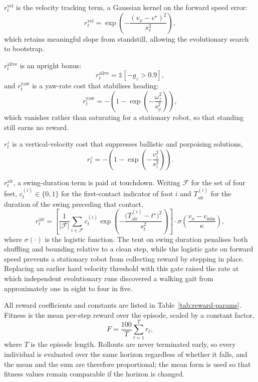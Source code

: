\documentclass{article} %
\begin{document}
$r^{\mathrm{vel}}_t$ is the velocity tracking term, a Gaussian kernel on the forward speed error:
\begin{equation}
r^{\mathrm{vel}}_t = \exp\!\left(
-\frac{\left(v_x - v^\star\right)^2}{s_v^2}\right),
\label{eq:r-vel}
\end{equation}
which retains meaningful slope from standstill, allowing the evolutionary
search to bootstrap.

$r^{\mathrm{alive}}_t$ is an upright bonus:
\begin{equation}
r^{\mathrm{alive}}_t = \mathbb{1}\!\left[-g_z > 0.9\right],
\label{eq:r-alive}
\end{equation}
and $r^{\mathrm{yaw}}_t$ is a yaw-rate cost that stabilises heading:
\begin{equation}
r^{\mathrm{yaw}}_t = -\left(1 - \exp\!\left(
-\frac{\omega_z^2}{s_\psi^2}\right)\right),
\label{eq:r-yaw}
\end{equation}
which vanishes rather than saturating for a stationary robot, so that standing
still earns no reward.

$r^{z}_t$ is a vertical-velocity cost that suppresses ballistic
and porpoising solutions,
\begin{equation}
r^{z}_t = -\left(1 - \exp\!\left(
-\frac{v_z^2}{s_z^2}\right)\right).
\label{eq:r-vz}
\end{equation}

$r^{\mathrm{air}}_t$, a swing-duration term is paid at touchdown. Writing $\mathcal{F}$ for
the set of four feet, $c^{(i)}_t \in \{0, 1\}$ for the first-contact indicator
of foot $i$ and $T^{(i)}_{\mathrm{air}}$ for the duration of the swing
preceding that contact,
\begin{equation}
r^{\mathrm{air}}_t = \left[
\frac{1}{|\mathcal{F}|}\sum_{i \in \mathcal{F}} c^{(i)}_t
\exp\!\left(-\frac{\bigl(T^{(i)}_{\mathrm{air}} - t^\star\bigr)^2}
{s_t^2}\right)\right]
\cdot \sigma\!\left(\frac{v_x - v_{\mathrm{min}}}{\kappa}\right),
\label{eq:r-air}
\end{equation}
where $\sigma(\cdot)$ is the logistic function. The tent on swing duration
penalises both shuffling and bounding relative to a clean step, while the
logistic gate on forward speed prevents a stationary robot from collecting
reward by stepping in place. Replacing an earlier hard velocity threshold with
this gate raised the rate at which independent evolutionary runs discovered a
walking gait from approximately one in eight to four in five.


All reward coefficients and constants are listed in
Table~\ref{tab:reward-params}. Fitness is the mean per-step reward over the
episode, scaled by a constant factor,
\begin{equation}
F = \frac{100}{T} \sum_{t=1}^{T} r_t,
\label{eq:fitness}
\end{equation}
where $T$ is the episode length. Rollouts are never terminated early, so every
individual is evaluated over the same horizon regardless of whether it falls,
and the mean and the sum are therefore proportional; the mean form is used so
that fitness values remain comparable if the horizon is changed.
\end{document}
